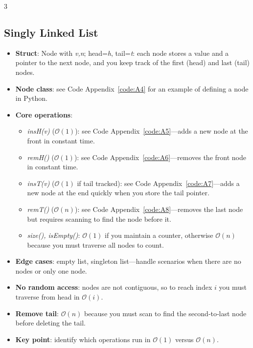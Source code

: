\documentclass[6pt,landscape]{article}
\newcommand{\bigO}[1]{\ensuremath{\mathcal{O}(#1)}}
\newcommand{\keyword}[1]{\textbf{\textcolor{keywordcolor}{#1}}}
\newcommand{\op}[1]{\textit{\textcolor{opcolor}{#1}}}
\begin{document}
\begin{multicols}{3}
\subsection{Singly Linked List}\label{sec:sll}
\begin{itemize}
  \item \keyword{Struct}: Node with \emph{v,n}; head=\emph{h}, tail=\emph{t}: each node stores a value and a pointer to the next node, and you keep track of the first (head) and last (tail) nodes.
  \item \textbf{Node class}: see Code Appendix~\ref{code:A4} for an example of defining a node in Python.
  \item \textbf{Core operations}:
    \begin{itemize}
      \item \op{insH(v)} (\bigO{1}): see Code Appendix~\ref{code:A5}—adds a new node at the front in constant time.
      \item \op{remH()} (\bigO{1}): see Code Appendix~\ref{code:A6}—removes the front node in constant time.
      \item \op{insT(v)} (\bigO{1} if tail tracked): see Code Appendix~\ref{code:A7}—adds a new node at the end quickly when you store the tail pointer.
      \item \op{remT()} (\bigO{n}): see Code Appendix~\ref{code:A8}—removes the last node but requires scanning to find the node before it.
      \item \op{size(), isEmpty()}: \bigO{1} if you maintain a counter, otherwise \bigO{n} because you must traverse all nodes to count.
    \end{itemize}
  \item \textbf{Edge cases}: empty list, singleton list—handle scenarios when there are no nodes or only one node.
  \item \keyword{No random access}: nodes are not contiguous, so to reach index \(i\) you must traverse from head in \(\bigO{i}\).
  \item \keyword{Remove tail}: \(\bigO{n}\) because you must scan to find the second‐to‐last node before deleting the tail.
  \item \textbf{Key point}: identify which operations run in \bigO{1} versus \bigO{n}.
\end{itemize}


\end{multicols}
\end{document}
